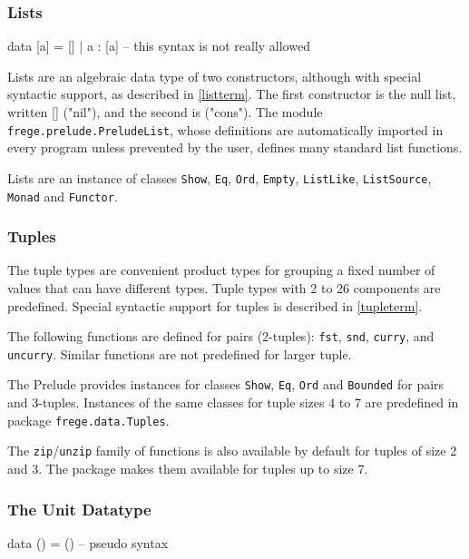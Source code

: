 \subsubsection{Lists} \label{listtype}  

\begin{code}
data [a] = [] | a : [a]    -- this syntax is not really allowed
\end{code}

Lists are an algebraic data type of two constructors, although with special syntactic support, as described in \autoref{listterm}.
The first constructor is the null list, written [] ("nil"), and the second is \sym{:} ("cons"). The module \texttt{frege.prelude.PreludeList}, whose definitions are automatically imported in every \frege{} program unless prevented by the user, defines many standard list functions.

Lists are an instance of classes \texttt{Show}, \texttt{Eq}, \texttt{Ord}, \texttt{Empty}, \texttt{ListLike}, \texttt{ListSource}, \texttt{Monad} and \texttt{Functor}.


\subsubsection{Tuples} \label{tupletypes}  

The tuple types are convenient product types for grouping a fixed number of  values that can have different types. Tuple types with 2 to 26 components are predefined. Special syntactic support for tuples is described in \autoref{tupleterm}.

The following functions are defined for pairs (2-tuples): \texttt{fst}, \texttt{snd}, \texttt{curry}, and \texttt{uncurry}. Similar functions are not predefined for larger tuple.

The Prelude provides instances for classes \texttt{Show}, \texttt{Eq}, \texttt{Ord} and \texttt{Bounded} for pairs and 3-tuples. 
Instances of the same classes for tuple sizes 4 to 7 are predefined in package \texttt{frege.data.Tuples}.

The \texttt{zip}/\texttt{unzip} family of functions is also available by default for tuples of size 2 and 3. 
The package  makes them available for tuples up to size 7.


\subsubsection{The Unit Datatype} \label{unittype} 
\begin{code}
data () = ()    -- pseudo syntax
\end{code}

